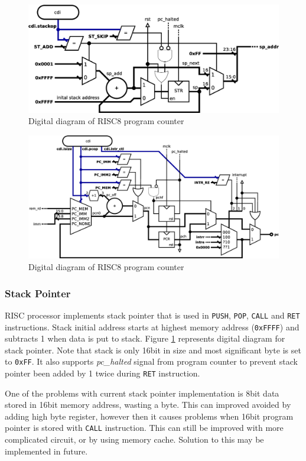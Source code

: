\documentclass[a4paper,12pt]{article}
\begin{document}
\begin{figure}[hb!]
\centering
\includegraphics[scale=0.4]{graphics/stack_diagram.eps}
\caption{Digital diagram of RISC8 program counter}
\label{fig:stack_pointer}
\end{figure}

\pagebreak
	
\begin{figure}[ht!]
	\centering
	\includegraphics[width=\columnwidth]{graphics/program_counter.eps}
	\caption{Digital diagram of RISC8 program counter}
	\label{fig:program_counter}
\end{figure}

\begin{multicols}{2}
	
\subsubsection{Stack Pointer} \label{sec:sp}
RISC processor implements stack pointer that is used in \texttt{PUSH}, \texttt{POP}, \texttt{CALL} and \texttt{RET} instructions. Stack initial address starts at highest memory address (\texttt{0xFFFF}) and subtracts 1 when data is put to stack. Figure \ref{fig:stack_pointer} represents digital diagram for stack pointer. Note that stack is only 16bit in size and most significant byte is set to \texttt{0xFF}. It also supports \textit{pc\_halted} signal from program counter to prevent stack pointer been added by 1 twice during \texttt{RET} instruction. 

One of the problems with current stack pointer implementation is 8bit data stored in 16bit memory address, wasting a byte. This can improved avoided by adding high byte register, however then it causes problems when 16bit program pointer is stored with \texttt{CALL} instruction. This can still be improved with more complicated circuit, or by using memory cache. Solution to this may be implemented in future.

\end{multicols}
\end{document}
